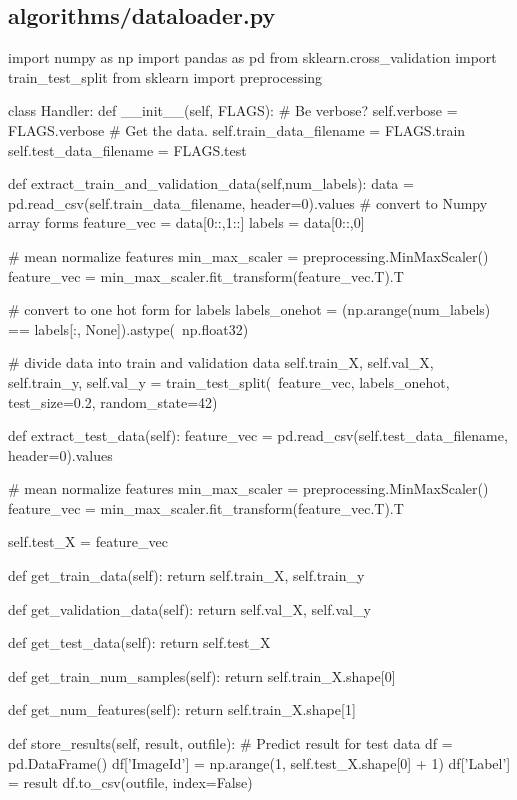 \documentclass{article}
\begin{document}
\subsection*{algorithms/dataloader.py}
\begin{python}
import numpy as np
import pandas as pd
from sklearn.cross_validation import train_test_split
from sklearn import preprocessing


class Handler:
    def __init__(self, FLAGS):
        # Be verbose?
        self.verbose = FLAGS.verbose
        # Get the data.
        self.train_data_filename = FLAGS.train
        self.test_data_filename = FLAGS.test


    def extract_train_and_validation_data(self,num_labels):
        data = pd.read_csv(self.train_data_filename, header=0).values
        # convert to Numpy array forms
        feature_vec = data[0::,1::]
        labels = data[0::,0]

        # mean normalize features
        min_max_scaler = preprocessing.MinMaxScaler()
        feature_vec = min_max_scaler.fit_transform(feature_vec.T).T

        # convert to one hot form for labels
        labels_onehot = (np.arange(num_labels) == labels[:, None]).astype(\
            np.float32)

        # divide data into train and validation data
        self.train_X, self.val_X, self.train_y, self.val_y = train_test_split(\
            feature_vec, labels_onehot, test_size=0.2, random_state=42)


    def extract_test_data(self):
        feature_vec = pd.read_csv(self.test_data_filename, header=0).values

        # mean normalize features
        min_max_scaler = preprocessing.MinMaxScaler()
        feature_vec = min_max_scaler.fit_transform(feature_vec.T).T

        self.test_X = feature_vec

    def get_train_data(self):
        return self.train_X, self.train_y

    def get_validation_data(self):
        return self.val_X, self.val_y

    def get_test_data(self):
        return self.test_X

    def get_train_num_samples(self):
        return self.train_X.shape[0]

    def get_num_features(self):
        return self.train_X.shape[1]

    def store_results(self, result, outfile):
        # Predict result for test data
        df = pd.DataFrame()
        df['ImageId'] = np.arange(1, self.test_X.shape[0] + 1)
        df['Label'] = result
        df.to_csv(outfile, index=False)


\end{python}
\end{document}
